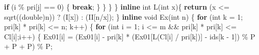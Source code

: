 \documentclass[
]{article}
\newenvironment{Shaded}{}{}
\newcommand{\ControlFlowTok}[1]{\textcolor[rgb]{0.00,0.44,0.13}{\textbf{#1}}}
\newcommand{\DataTypeTok}[1]{\textcolor[rgb]{0.56,0.13,0.00}{#1}}
\newcommand{\DecValTok}[1]{\textcolor[rgb]{0.25,0.63,0.44}{#1}}
\newcommand{\KeywordTok}[1]{\textcolor[rgb]{0.00,0.44,0.13}{\textbf{#1}}}
\newcommand{\NormalTok}[1]{#1}
\newcommand{\OperatorTok}[1]{\textcolor[rgb]{0.40,0.40,0.40}{#1}}
\begin{document}
\begin{Shaded}
\begin{Highlighting}[]
                \ControlFlowTok{if} \OperatorTok{(}\NormalTok{i }\OperatorTok{\%}\NormalTok{ pri}\OperatorTok{[}\NormalTok{j}\OperatorTok{]} \OperatorTok{==} \DecValTok{0}\OperatorTok{)}
                \OperatorTok{\{}
                    \ControlFlowTok{break}\OperatorTok{;}
                \OperatorTok{\}}
            \OperatorTok{\}}
        \OperatorTok{\}}
    \OperatorTok{\}}
    \KeywordTok{inline} \DataTypeTok{int}\NormalTok{ L}\OperatorTok{(}\DataTypeTok{int}\NormalTok{ x}\OperatorTok{)\{}
        \ControlFlowTok{return} \OperatorTok{(}\NormalTok{x }\OperatorTok{\textless{}=}\NormalTok{ sqrt}\OperatorTok{((}\DataTypeTok{double}\OperatorTok{)}\NormalTok{n}\OperatorTok{))} \OperatorTok{?} \OperatorTok{(}\NormalTok{I}\OperatorTok{[}\NormalTok{x}\OperatorTok{])} \OperatorTok{:} \OperatorTok{(}\NormalTok{II}\OperatorTok{[}\NormalTok{n}\OperatorTok{/}\NormalTok{x}\OperatorTok{]);}
    \OperatorTok{\}}
    \KeywordTok{inline} \DataTypeTok{void}\NormalTok{ Ex}\OperatorTok{(}\DataTypeTok{int}\NormalTok{ n}\OperatorTok{)}
    \OperatorTok{\{}
        \ControlFlowTok{for} \OperatorTok{(}\DataTypeTok{int}\NormalTok{ k }\OperatorTok{=} \DecValTok{1}\OperatorTok{;}\NormalTok{ pri}\OperatorTok{[}\NormalTok{k}\OperatorTok{]} \OperatorTok{*}\NormalTok{ pri}\OperatorTok{[}\NormalTok{k}\OperatorTok{]} \OperatorTok{\textless{}=}\NormalTok{ n}\OperatorTok{;}\NormalTok{ k}\OperatorTok{++)}
        \OperatorTok{\{}
            \ControlFlowTok{for} \OperatorTok{(}\DataTypeTok{int}\NormalTok{ i }\OperatorTok{=} \DecValTok{1}\OperatorTok{;}\NormalTok{ i }\OperatorTok{\textless{}=}\NormalTok{ m }\OperatorTok{\&\&}\NormalTok{ pri}\OperatorTok{[}\NormalTok{k}\OperatorTok{]} \OperatorTok{*}\NormalTok{ pri}\OperatorTok{[}\NormalTok{k}\OperatorTok{]} \OperatorTok{\textless{}=}\NormalTok{ Cl}\OperatorTok{[}\NormalTok{i}\OperatorTok{];}\NormalTok{i}\OperatorTok{++)}
            \OperatorTok{\{}
\NormalTok{                Ex01}\OperatorTok{[}\NormalTok{i}\OperatorTok{]} \OperatorTok{=} \OperatorTok{(}\NormalTok{Ex01}\OperatorTok{[}\NormalTok{i}\OperatorTok{]} \OperatorTok{{-}}\NormalTok{ pri}\OperatorTok{[}\NormalTok{k}\OperatorTok{]} \OperatorTok{*} \OperatorTok{(}\NormalTok{Ex01}\OperatorTok{[}\NormalTok{L}\OperatorTok{(}\NormalTok{Cl}\OperatorTok{[}\NormalTok{i}\OperatorTok{]} \OperatorTok{/}\NormalTok{ pri}\OperatorTok{[}\NormalTok{k}\OperatorTok{])]} \OperatorTok{{-}}\NormalTok{ ids}\OperatorTok{[}\NormalTok{k }\OperatorTok{{-}} \DecValTok{1}\OperatorTok{])} \OperatorTok{\%}\NormalTok{ P }\OperatorTok{+}\NormalTok{ P }\OperatorTok{+}\NormalTok{ P}\OperatorTok{)} \OperatorTok{\%}\NormalTok{ P}\OperatorTok{;}

\end{Highlighting}
\end{Shaded}
\end{document}
